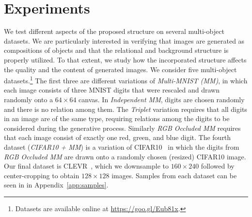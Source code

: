 \documentclass{article}
\begin{document}
\section{Experiments}
We test different aspects of the proposed structure on several multi-object datasets.
We are particularly interested in verifying that images are generated as compositions of objects and that the relational and background structure is properly utilized.
To that extent, we study how the incorporated structure affects the quality and the content of generated images.
We consider five multi-object datasets.\footnote{Datasets are available online at \url{https://goo.gl/Eub81x}.}
The first three are different variations of \emph{Multi-MNIST (MM)}, in which each image consists of three MNIST digits that were rescaled and drawn randomly onto a $64 \times 64$ canvas.
In \emph{Independent MM}, digits are chosen randomly and there is no relation among them.
The \emph{Triplet} variation requires that all digits in an image are of the same type, requiring relations among the digits to be considered during the generative process.
Similarly \emph{RGB Occluded MM} requires that each image consist of exactly one red, green, and blue digit.
The fourth dataset (\emph{CIFAR10 + MM}) is a variation of CIFAR10~\citep{krizhevsky2009learning} in which the digits from \emph{RGB Occluded MM} are drawn onto a randomly chosen (resized) CIFAR10 image.
Our final dataset is CLEVR~\citep{johnson2017clevr}, which we downsample to $160 \times 240$ followed by center-cropping to obtain $128 \times 128$ images.
Samples from each dataset can be seen in in Appendix~\ref{app:samples}.
\end{document}
